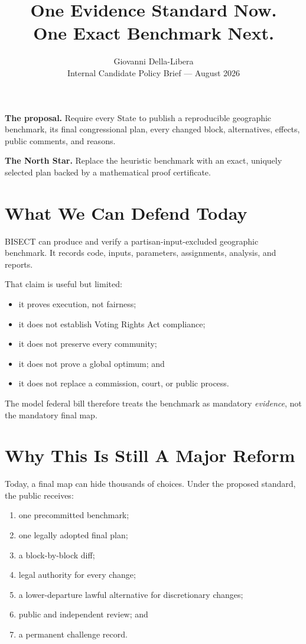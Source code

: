\documentclass[11pt,twocolumn]{article}
\title{\textbf{One Evidence Standard Now.\\One Exact Benchmark Next.}}
\author{Giovanni Della-Libera\\\small Internal Candidate Policy Brief --- August 2026}
\date{}
\begin{document}
\maketitle

\begin{mdframed}[style=bluebox]
\textbf{The proposal.} Require every State to publish a reproducible geographic
benchmark, its final congressional plan, every changed block, alternatives,
effects, public comments, and reasons.

\textbf{The North Star.} Replace the heuristic benchmark with an exact,
uniquely selected plan backed by a mathematical proof certificate.
\end{mdframed}

\section*{What We Can Defend Today}

BISECT can produce and verify a partisan-input-excluded geographic benchmark.
It records code, inputs, parameters, assignments, analysis, and reports.

That claim is useful but limited:

\begin{itemize}[leftmargin=*,nosep]
\item it proves execution, not fairness;
\item it does not establish Voting Rights Act compliance;
\item it does not preserve every community;
\item it does not prove a global optimum; and
\item it does not replace a commission, court, or public process.
\end{itemize}

The model federal bill therefore treats the benchmark as mandatory
\emph{evidence}, not the mandatory final map.

\section*{Why This Is Still A Major Reform}

Today, a final map can hide thousands of choices. Under the proposed standard,
the public receives:

\begin{enumerate}[leftmargin=*,nosep]
\item one precommitted benchmark;
\item one legally adopted final plan;
\item a block-by-block diff;
\item legal authority for every change;
\item a lower-departure lawful alternative for discretionary changes;
\item public and independent review; and
\item a permanent challenge record.
\end{enumerate}
\end{document}
